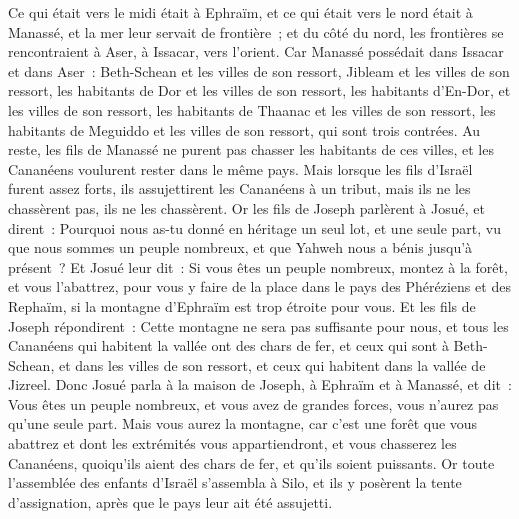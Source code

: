 \begin{multicols}{2}
Ce qui était vers le midi était à Ephraïm, et ce qui était vers le nord était à Manassé, et la mer leur servait de frontière~; et du côté du nord, les frontières se rencontraient à Aser, à Issacar, vers l'orient.
Car Manassé possédait dans Issacar et dans Aser~: Beth-Schean et les villes de son ressort, Jibleam et les villes de son ressort, les habitants de Dor et les villes de son ressort, les habitants d'En-Dor, et les villes de son ressort, les habitants de Thaanac et les villes de son ressort, les habitants de Meguiddo et les villes de son ressort, qui sont trois contrées.
Au reste, les fils de Manassé ne purent pas chasser les habitants de ces villes, et les Cananéens voulurent rester dans le même pays.
Mais lorsque les fils d'Israël furent assez forts, ils assujettirent les Cananéens à un tribut, mais ils ne les chassèrent pas, ils ne les chassèrent.
Or les fils de Joseph parlèrent à Josué, et dirent~: Pourquoi nous as-tu donné en héritage un seul lot, et une seule part, vu que nous sommes un peuple nombreux, et que Yahweh nous a bénis jusqu'à présent~?
Et Josué leur dit~: Si vous êtes un peuple nombreux, montez à la forêt, et vous l'abattrez, pour vous y faire de la place dans le pays des Phéréziens et des Rephaïm, si la montagne d'Ephraïm est trop étroite pour vous.
Et les fils de Joseph répondirent~: Cette montagne ne sera pas suffisante pour nous, et tous les Cananéens qui habitent la vallée ont des chars de fer, et ceux qui sont à Beth-Schean, et dans les villes de son ressort, et ceux qui habitent dans la vallée de Jizreel.
Donc Josué parla à la maison de Joseph, à Ephraïm et à Manassé, et dit~: Vous êtes un peuple nombreux, et vous avez de grandes forces, vous n'aurez pas qu'une seule part.
Mais vous aurez la montagne, car c'est une forêt que vous abattrez et dont les extrémités vous appartiendront, et vous chasserez les Cananéens, quoiqu'ils aient des chars de fer, et qu'ils soient puissants.
\VerseOne{}Or toute l'assemblée des enfants d'Israël s'assembla à Silo, et ils y posèrent la tente d'assignation, après que le pays leur ait été assujetti. 

\end{multicols}

